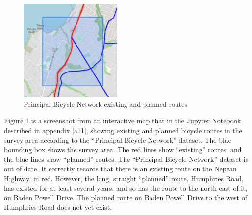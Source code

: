 \documentclass[11pt,twoside]{report}
\begin{document}
\begin{figure}[h]
\centering
\includegraphics[width=0.45\textwidth]{map1_5.png}
\caption{Principal Bicycle Network existing and planned routes}
\label{fig:rq2c}
\end{figure}

Figure \ref{fig:rq2c} is a screenshot from an interactive map that in the Jupyter Notebook described in appendix \ref{a11}, showing existing and planned bicycle routes in the survey area according to the ``Principal Bicycle Network'' dataset.  The blue bounding box shows the survey area.  The red lines show ``existing'' routes, and the blue lines show ``planned'' routes.  The ``Principal Bicycle Network'' dataset is out of date.  It correctly records that there is an existing route on the Nepean Highway, in red.  However, the long, straight ``planned'' route, Humphries Road, has existed for at least several years, and so has the route to the north-east of it, on Baden Powell Drive.  The planned route on Baden Powell Drive to the west of Humphries Road does not yet exist.
\end{document}
